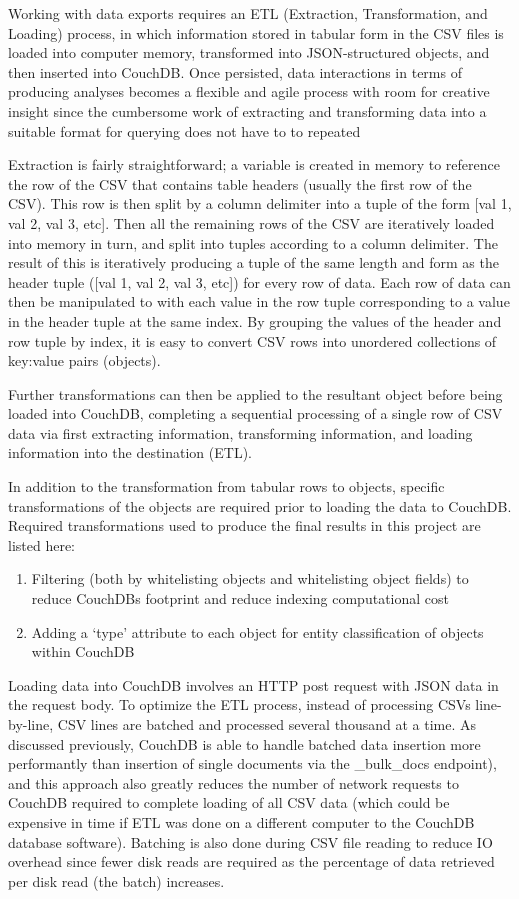 Working with data exports requires an ETL (Extraction, Transformation, and Loading) process, in which information stored in tabular form in the CSV files is loaded into computer memory, transformed into JSON-structured objects, and then inserted into CouchDB. Once persisted, data interactions in terms of producing analyses becomes a flexible and agile process with room for creative insight since the cumbersome work of extracting and transforming data into a suitable format for querying does not have to to repeated

Extraction is fairly straightforward; a variable is created in memory to reference the row of the CSV that contains table headers (usually the first row of the CSV). This row is then split by a column delimiter into a tuple of the form [val 1, val 2, val 3, etc]. Then all the remaining rows of the CSV are iteratively loaded into memory in turn, and split into tuples according to a column delimiter. The result of this is iteratively producing a tuple of the same length and form as the header tuple ([val 1, val 2, val 3, etc]) for every row of data. Each row of data can then be manipulated to with each value in the row tuple corresponding to a value in the header tuple at the same index. By grouping the values of the header and row tuple by index, it is easy to convert CSV rows into unordered collections of key:value pairs (objects).

Further transformations can then be applied to the resultant object before being loaded into CouchDB, completing a sequential processing of a single row of CSV data via first extracting information, transforming information, and loading information into the destination (ETL).

In addition to the transformation from tabular rows to objects, specific transformations of the objects are required prior to loading the data to CouchDB. Required transformations used to produce the final results in this project are listed here:

\begin{enumerate}
    \item Filtering (both by whitelisting objects and whitelisting object fields) to reduce CouchDBs footprint and reduce indexing computational cost
    \item Adding a `type' attribute to each object for entity classification of objects within CouchDB
\end{enumerate}

Loading data into CouchDB involves an HTTP post request with JSON data in the request body. To optimize the ETL process, instead of processing CSVs line-by-line, CSV lines are batched and processed several thousand at a time. As discussed previously, CouchDB is able to handle batched data insertion more performantly than insertion of single documents via the \_bulk\_docs endpoint), and this approach also greatly reduces the number of network requests to CouchDB required to complete loading of all CSV data (which could be expensive in time if ETL was done on a different computer to the CouchDB database software). Batching is also done during CSV file reading to reduce IO overhead since fewer disk reads are required as the percentage of data retrieved per disk read (the batch) increases.

